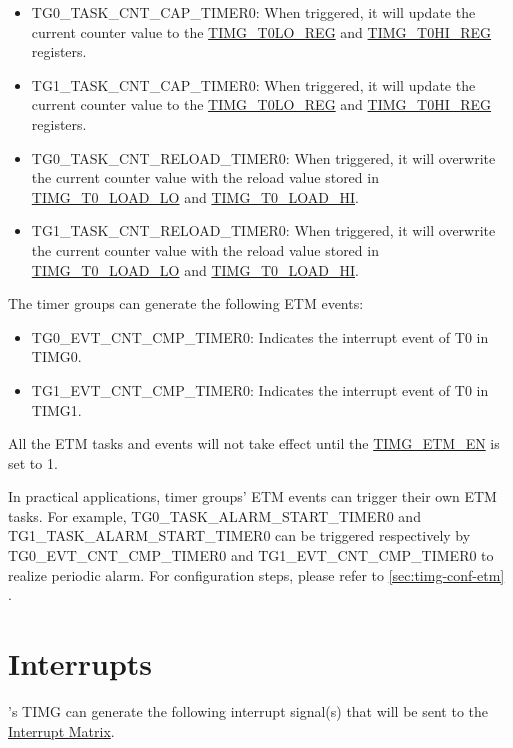 \documentclass[main\_\_EN.tex]{subfiles}
\begin{document}
\begin{itemize}
\item TG0\_TASK\_CNT\_CAP\_TIMER0: When triggered, it will update the current counter value to the \hyperref[regdesc:TIMGTXLOREG]{TIMG\_T0LO\_REG} and \hyperref[regdesc:TIMGTXHIREG]{TIMG\_T0HI\_REG} registers.
\item TG1\_TASK\_CNT\_CAP\_TIMER0: When triggered, it will update the current counter value to the \hyperref[regdesc:TIMGTXLOREG]{TIMG\_T0LO\_REG} and \hyperref[regdesc:TIMGTXHIREG]{TIMG\_T0HI\_REG} registers.
\item TG0\_TASK\_CNT\_RELOAD\_TIMER0: When triggered, it will overwrite the current counter value with the reload value stored in \hyperref[fielddesc:TIMGTXLOADLO]{TIMG\_T0\_LOAD\_LO} and \hyperref[fielddesc:TIMGTXLOADHI]{TIMG\_T0\_LOAD\_HI}.
\item TG1\_TASK\_CNT\_RELOAD\_TIMER0: When triggered, it will overwrite the current counter value with the reload value stored in \hyperref[fielddesc:TIMGTXLOADLO]{TIMG\_T0\_LOAD\_LO} and \hyperref[fielddesc:TIMGTXLOADHI]{TIMG\_T0\_LOAD\_HI}.
\end{itemize}

The timer groups can generate the following ETM events:

\begin{itemize}
\item TG0\_EVT\_CNT\_CMP\_TIMER0: Indicates the interrupt event of T0 in TIMG0.
\item TG1\_EVT\_CNT\_CMP\_TIMER0: Indicates the interrupt event of T0 in TIMG1.
\end{itemize}

All the ETM tasks and events will not take effect until the \hyperref[fielddesc:TIMGETMEN]{TIMG\_ETM\_EN} is set to 1.

In practical applications, timer groups' ETM events can trigger their own ETM tasks. For example, TG0\_TASK\_ALARM\_START\_TIMER0 and TG1\_TASK\_ALARM\_START\_TIMER0 can be triggered respectively by TG0\_EVT\_CNT\_CMP\_TIMER0 and TG1\_EVT\_CNT\_CMP\_TIMER0 to realize periodic alarm. For configuration steps, please refer to \ref{sec:timg-conf-etm} .


\section{Interrupts}
\label{sec:timg-interrupt}

\chipname{}'s TIMG can generate the following interrupt signal(s) that will be sent to the \hyperref[mod:intmtrx]{Interrupt Matrix}.
\end{document}
